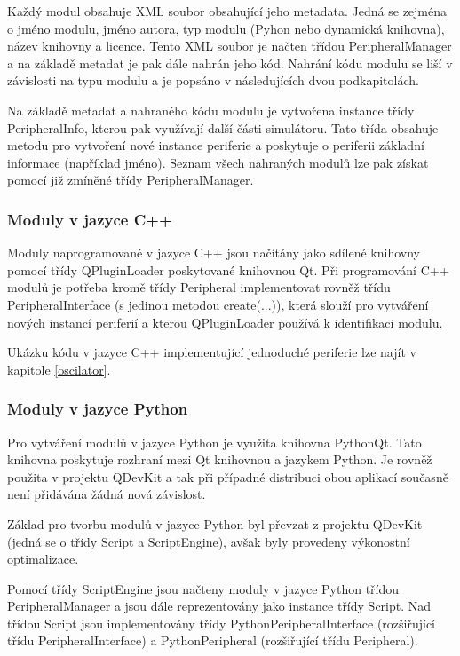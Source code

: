 Každý modul obsahuje XML soubor obsahující jeho metadata. Jedná se zejména o jméno modulu, jméno autora, typ modulu (Pyhon nebo dynamická knihovna), název knihovny a licence. Tento XML soubor je načten třídou PeripheralManager a na základě metadat je pak dále nahrán jeho kód. Nahrání kódu modulu se liší v závislosti na typu modulu a je popsáno v následujících dvou podkapitolách.

Na základě metadat a nahraného kódu modulu je vytvořena instance třídy PeripheralInfo, kterou pak využívají další části simulátoru. Tato třída obsahuje metodu pro vytvoření nové instance periferie a poskytuje o periferii základní informace (například jméno). Seznam všech nahraných modulů lze pak získat pomocí již zmíněné třídy PeripheralManager.

\subsubsection{Moduly v jazyce C++}

Moduly naprogramované v jazyce C++ jsou načítány jako sdílené knihovny pomocí třídy QPluginLoader poskytované knihovnou Qt. Při programování C++ modulů je potřeba kromě třídy Peripheral implementovat rovněž třídu PeripheralInterface (s jedinou metodou create(...)), která slouží pro vytváření nových instancí periferií a kterou QPluginLoader používá k identifikaci modulu.

Ukázku kódu v jazyce C++ implementující jednoduché periferie lze najít v kapitole \ref{oscilator}.

\subsubsection{Moduly v jazyce Python}

Pro vytváření modulů v jazyce Python je využita knihovna PythonQt. Tato knihovna poskytuje rozhraní mezi Qt knihovnou a jazykem Python. Je rovněž použita v projektu QDevKit a tak při případné distribuci obou aplikací současně není přidávána žádná nová závislost.

Základ pro tvorbu modulů v jazyce Python byl převzat z projektu QDevKit (jedná se o třídy Script a ScriptEngine), avšak byly provedeny výkonostní optimalizace.

Pomocí třídy ScriptEngine jsou načteny moduly v jazyce Python třídou PeripheralManager a jsou dále reprezentovány jako instance třídy Script. Nad třídou Script jsou implementovány třídy PythonPeripheralInterface (rozšiřující třídu PeripheralInterface) a PythonPeripheral (rozšiřující třídu Peripheral).

